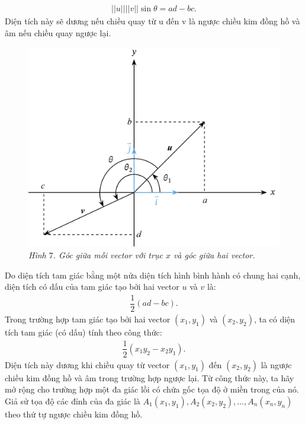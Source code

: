 \begin{multicols}{2}
	\begin{align*}
		||u||||v||\sin\theta = ad - bc.
	\end{align*}
	Diện tích này sẽ dương nếu chiều quay từ u đến v là ngược chiều kim đồng hồ và âm nếu chiều quay ngược lại.
	\begin{figure}[H]
		\vspace*{-5pt}
		\centering
		\captionsetup{labelformat= empty, justification=centering}
		\includegraphics[width= 1\linewidth]{11}
		\caption{\small\textit{\color{toanhocdoisong}Hình $7$. Góc giữa mỗi vector với trục $x$ và góc giữa hai vector.}}
		\vspace*{-10pt}
	\end{figure}
	Do diện tích tam giác bằng một nửa diện tích hình bình hành có chung hai cạnh, diện tích có dấu của tam giác tạo bởi hai vector $u$ và $v$ là:
	\begin{align*}
		\dfrac{1}{2}(ad-bc).
	\end{align*}
	Trong trường hợp tam giác tạo bởi hai vector $(x_1,y_1)$ và $(x_2,y_2)$, ta có diện tích tam giác (có dấu) tính theo công thức:
	\begin{align*}
		\dfrac{1}{2}(x_1y_2 - x_2y_1).
	\end{align*}
	Diện tích này dương khi chiều quay từ vector $(x_1,y_1)$ đến $(x_2,y_2)$ là ngược chiều kim đồng hồ và âm trong trường hợp ngược lại.
	\vskip 0.1cm
	Từ công thức này, ta hãy mở rộng cho trường hợp một đa giác lồi có chứa gốc tọa độ ở miền trong của nó. Giả sử tọa độ các đỉnh của đa giác là $A_1(x_1,y_1),A_2 (x_2,y_2),\ldots,A_n(x_n,y_n)$ theo thứ tự ngược chiều kim đồng hồ.

\end{multicols}

